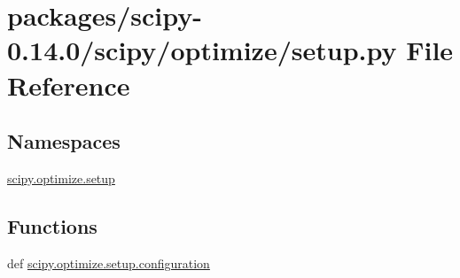 \hypertarget{packages_2scipy-0_814_80_2scipy_2optimize_2setup_8py}{}\section{packages/scipy-\/0.14.0/scipy/optimize/setup.py File Reference}
\label{packages_2scipy-0_814_80_2scipy_2optimize_2setup_8py}
\subsection*{Namespaces}
\begin{DoxyCompactItemize}
\item 
 \hyperlink{namespacescipy_1_1optimize_1_1setup}{scipy.\+optimize.\+setup}
\end{DoxyCompactItemize}
\subsection*{Functions}
\begin{DoxyCompactItemize}
\item 
def \hyperlink{namespacescipy_1_1optimize_1_1setup_a8cec3fb5d588ec74d955c86aaf3b69bf}{scipy.\+optimize.\+setup.\+configuration}
\end{DoxyCompactItemize}
